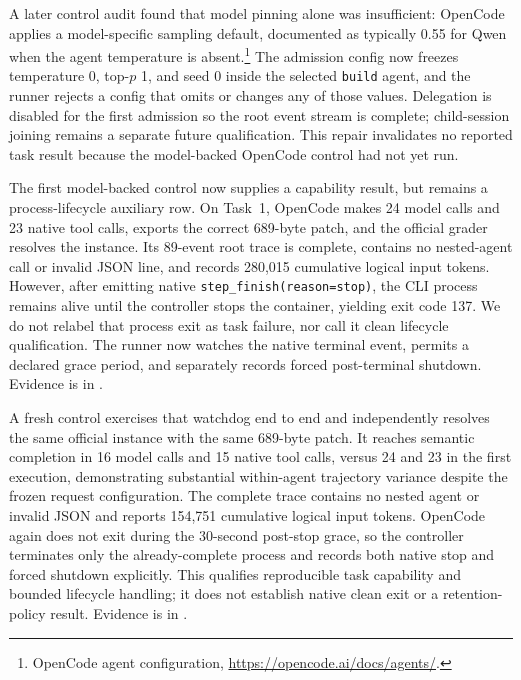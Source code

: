\documentclass[11pt]{article}
\begin{document}
A later control audit found that model pinning alone was insufficient:
OpenCode applies a model-specific sampling default, documented as typically
0.55 for Qwen when the agent temperature is absent.\footnote{OpenCode agent
configuration, \url{https://opencode.ai/docs/agents/}.} The admission config now
freezes temperature 0, top-$p$ 1, and seed 0 inside the selected
\texttt{build} agent, and the runner rejects a config that omits or changes any
of those values.  Delegation is disabled for the first admission so the root
event stream is complete; child-session joining remains a separate future
qualification.  This repair invalidates no reported task result because the
model-backed OpenCode control had not yet run.

The first model-backed control now supplies a capability result, but remains a
process-lifecycle auxiliary row.  On Task~1, OpenCode makes 24 model calls and
23 native tool calls, exports the correct 689-byte patch, and the official
grader resolves the instance.  Its 89-event root trace is complete, contains
no nested-agent call or invalid JSON line, and records 280,015 cumulative
logical input tokens.  However, after emitting native
\texttt{step\_finish(reason=stop)}, the CLI process remains alive until the
controller stops the container, yielding exit code 137.  We do not relabel
that process exit as task failure, nor call it clean lifecycle qualification.
The runner now watches the native terminal event, permits a declared grace
period, and separately records forced post-terminal shutdown.  Evidence is in
.

A fresh control exercises that watchdog end to end and independently resolves
the same official instance with the same 689-byte patch.  It reaches semantic
completion in 16 model calls and 15 native tool calls, versus 24 and 23 in the
first execution, demonstrating substantial within-agent trajectory variance
despite the frozen request configuration.  The complete trace contains no
nested agent or invalid JSON and reports 154,751 cumulative logical input
tokens.  OpenCode again does not exit during the 30-second post-stop grace, so
the controller terminates only the already-complete process and records both
native stop and forced shutdown explicitly.  This qualifies reproducible task
capability and bounded lifecycle handling; it does not establish native clean
exit or a retention-policy result.  Evidence is in
.
\end{document}
